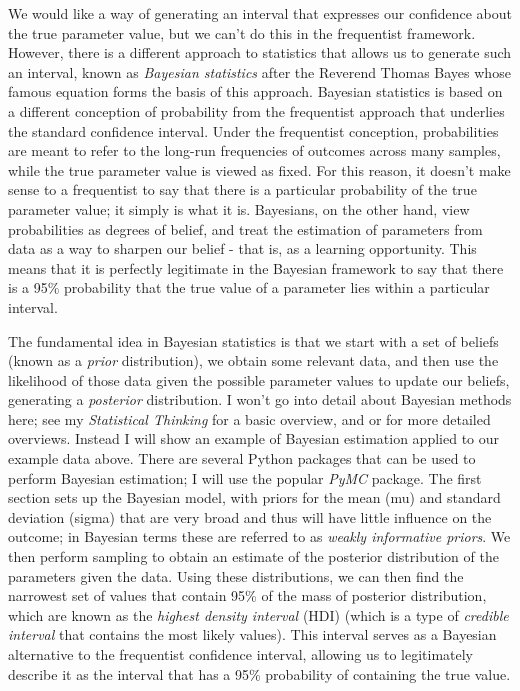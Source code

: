 We would like a way of generating an interval that expresses our confidence about the true parameter value, but we can't do this in the frequentist framework. However, there is a different approach to statistics that allows us to generate such an interval, known as \textit{Bayesian statistics} after the Reverend Thomas Bayes whose famous equation forms the basis of this approach. Bayesian statistics is based on a different conception of probability from the frequentist approach that underlies the standard confidence interval.  Under the frequentist conception, probabilities are meant to refer to the long-run frequencies of outcomes across many samples, while the true parameter value is viewed as fixed. For this reason, it doesn't make sense to a frequentist to say that there is a particular probability of the true parameter value; it simply is what it is.  Bayesians, on the other hand, view probabilities as degrees of belief, and treat the estimation of parameters from data as a way to sharpen our belief - that is, as a learning opportunity.  This means that it is perfectly legitimate in the Bayesian framework to say that there is a 95\% probability that the true value of a parameter lies within a particular interval.

The fundamental idea in Bayesian statistics is that we start with a set of beliefs (known as a \textit{prior} distribution), we obtain some relevant data, and then use the likelihood of those data given the possible parameter values to update our beliefs, generating a \textit{posterior} distribution.  I won't go into detail about Bayesian methods here; see my \textit{Statistical Thinking} for a basic overview, and \cite{Gelman:2013} or \cite{McElreath:2020} for more detailed overviews.  Instead I will show an example of Bayesian estimation applied to our example data above. There are several Python packages that can be used to perform Bayesian estimation; I will use the popular \textit{PyMC} package.  The first section sets up the Bayesian model, with priors for the mean (mu) and standard deviation (sigma) that are very broad and thus will have little influence on the outcome; in Bayesian terms these are referred to as \textit{weakly informative priors}.  We then perform sampling to obtain an estimate of the posterior distribution of the parameters given the data.  Using these distributions, we can then find the narrowest set of values that contain 95\% of the mass of posterior distribution, which are known as the \textit{highest density interval} (HDI) (which is a type of \textit{credible interval} that contains the most likely values).  This interval serves as a Bayesian alternative to the frequentist confidence interval, allowing us to legitimately describe it as the interval that has a 95\% probability of containing the true value.

